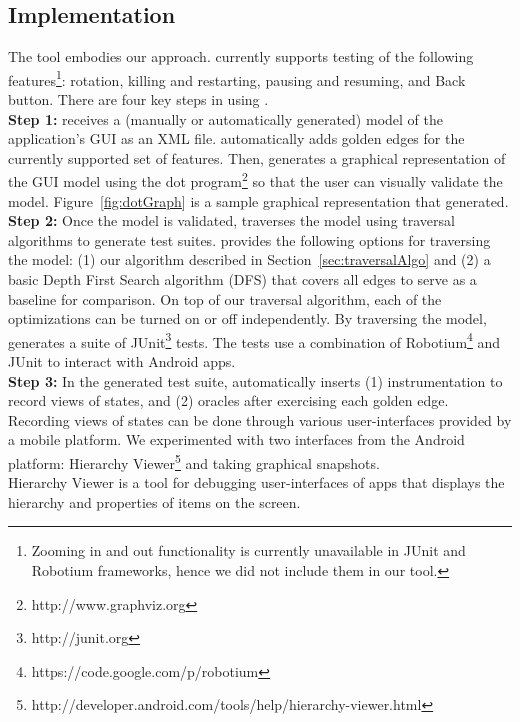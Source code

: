 \subsection{Implementation}

The \tool{} tool embodies our approach.  \tool{} currently supports
testing of the following features\footnote{Zooming in and out
  functionality is currently unavailable in JUnit and Robotium
  frameworks, hence we did not include them in our tool.}: rotation,
killing and restarting, pausing and resuming, and Back button.
{}
There are four key steps in using \tool.
\\
\indent
{\bf Step 1:} \tool{} receives a (manually or automatically generated)
model of the application's GUI as an XML file. \tool{} automatically
adds golden edges for the currently supported set of features.
Then, \tool{} generates a graphical representation of the GUI
model using the dot program\footnote{http://www.graphviz.org} so that
the user can visually validate the model. Figure~\ref{fig:dotGraph} is
a sample graphical representation that \tool{} generated.
\\
\indent
{\bf Step 2:}
Once the model is validated, \tool{} traverses the model using traversal algorithms to generate test suites. \tool{} provides the following options for traversing the model: (1) our algorithm described in Section~\ref{sec:traversalAlgo} and (2) a basic Depth First Search algorithm (DFS) that covers all edges to serve as a baseline for comparison. On top of our traversal algorithm, each of the optimizations can be turned on or off independently. By traversing the model, \tool{} generates a suite of JUnit\footnote{http://junit.org} tests. The tests use a combination of Robotium\footnote{https://code.google.com/p/robotium} and JUnit to interact with Android apps.
\\
\indent
{\bf Step 3:}
In the generated test suite, \tool{} automatically inserts (1) instrumentation to record views of states, and (2) oracles after exercising each golden edge.
Recording views of states can be done through various user-interfaces provided by a mobile platform. We experimented with two interfaces from the Android platform: Hierarchy Viewer\footnote{http://developer.android.com/tools/help/hierarchy-viewer.html} and taking graphical snapshots.
\\
\indent
Hierarchy Viewer is a tool for debugging user-interfaces of apps that displays the hierarchy and properties of items on the screen.
